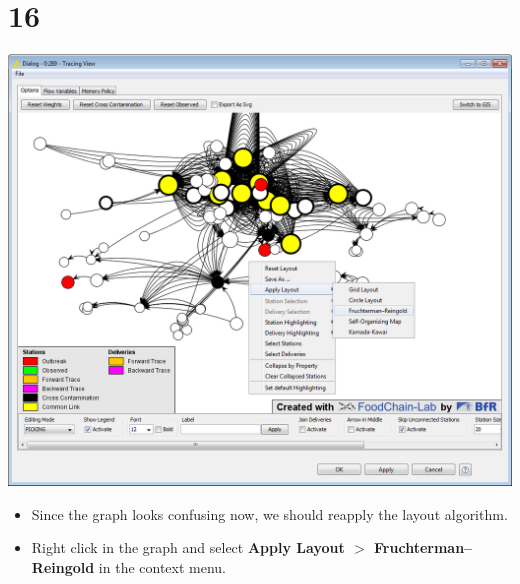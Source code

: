 \documentclass{beamer}
\begin{document}
\section{16}
\begin{frame}
	\begin{center}
  		\includegraphics[height=0.6\textheight]{16.png}
	\end{center}
	\begin{itemize}
		\item Since the graph looks confusing now, we should reapply the layout algorithm.
		\item Right click in the graph and select \textbf{Apply Layout $>$ Fruchterman–Reingold} in the context menu.
	\end{itemize}
\end{frame}
\end{document}
